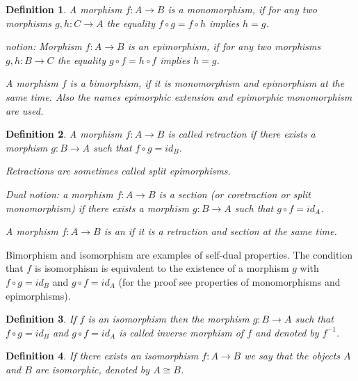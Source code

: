 \documentclass[12pt]{article}
\newcommand{\Map}[3]{#1:#2\to#3}
\newcommand{\inv}[1]{#1^{-1}}
\newtheorem{DEF}{Definition}
\begin{document}
\begin{DEF}
A morphism $\Map fAB$ is a \emph{monomorphism}, if for any two morphisms $\Map{g,h}CA$ the
equality $f\circ g=f\circ h$ implies $h=g$.

 notion: Morphism $\Map fAB$ is an \emph{epimorphism}, if
for any two morphisms $\Map{g,h}BC$ the equality $g\circ f=h\circ f$ implies $h=g$.

A morphism $f$ is a \emph{bimorphism}, if it is monomorphism and epimorphism at the same
time. Also the names \emph{epimorphic extension} and \emph{epimorphic monomorphism} are used.
\end{DEF}

\begin{DEF}
A morphism $\Map fAB$ is called \emph{retraction} if there exists a morphism $\Map gBA$ such
that $f\circ g=id_B$.

Retractions are sometimes called \emph{split epimorphisms}.

Dual notion: a morphism $\Map fAB$ is a \emph{section} (or \emph{coretraction} or \emph{split monomorphism}) if there exists a morphism $\Map gBA$ such that $g\circ f=id_A$.

A morphism $\Map fAB$ is an \emph{} if it is a
retraction and section at the same time.
\end{DEF}

Bimorphism and isomorphism are examples of self-dual properties.
The condition that $f$ is isomorphism is equivalent to the existence of a morphism $g$ with
$f\circ g=id_B$ and $g\circ f=id_A$ (for the proof see properties of monomorphisms and
epimorphisms).

\begin{DEF} If $f$ is an isomorphism then the morphism $\Map gBA$ such that $f\circ g=id_B$ and $g\circ f=id_A$ 
is called \emph{inverse} morphism of $f$ and denoted by $\inv f$.
\end{DEF}

\begin{DEF}
If there exists an isomorphism $\Map fAB$ we say that the objects $A$ and $B$ are
\emph{isomorphic}, denoted by $A\cong B$.
\end{DEF}

\end{document}
